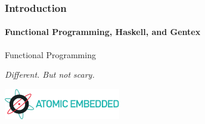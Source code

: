 \begin{frame}
  \frametitle{Introduction}
  \framesubtitle{Functional Programming, Haskell, and Gentex}

  \huge
  Functional Programming

  \normalsize
  \emph{Different. But not scary.}
  \newline
  \newline
  \newline
  \newline

  \begin{flushright}
    \includegraphics[width=2.0in]{graphics/AE-logo-white.pdf}
  \end{flushright}
\end{frame}
